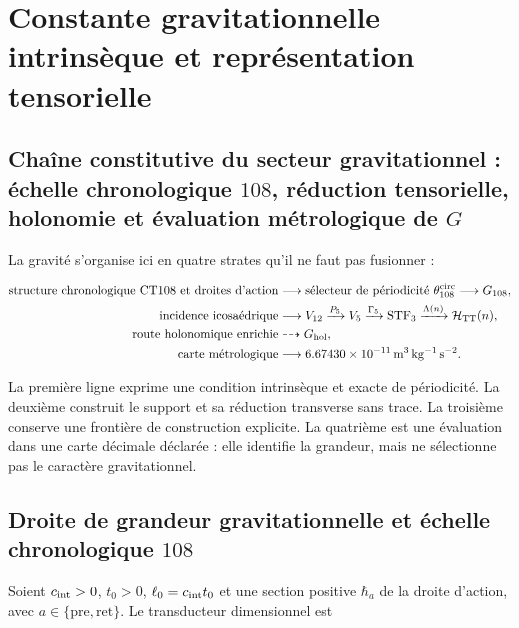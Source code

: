 \section{Constante gravitationnelle intrinsèque et représentation tensorielle}
\label{rm:ch:gravity}

\subsection{Chaîne constitutive du secteur gravitationnel : échelle chronologique \texorpdfstring{\(108\)}{108}, réduction tensorielle, holonomie et évaluation métrologique de \texorpdfstring{\(G\)}{G}}

La gravité s'organise ici en quatre strates qu'il ne faut pas fusionner :

\begin{equation}
\label{rm:eq:gravity-causal-chain}
\begin{aligned}
\text{structure chronologique CT108 et droites d'action}
&\longrightarrow \text{sélecteur de périodicité }\theta_{108}^{\rm circ}
\longrightarrow G_{108},\\
\text{incidence icosaédrique}
&\longrightarrow V_{12}\xrightarrow{P_5}V_5
\xrightarrow{\Gamma_5}\operatorname{STF}_3
\xrightarrow{\Lambda(n)}\mathcal H_{\rm TT}(n),\\
\text{route holonomique enrichie}
&\dashrightarrow G_{\rm hol},\\
\text{carte métrologique}
&\longrightarrow 6.67430\times10^{-11}\,
\mathrm{m^3\,kg^{-1}\,s^{-2}}.
\end{aligned}
\end{equation}

La première ligne exprime une condition intrinsèque et exacte de
périodicité. La deuxième construit
le support et sa réduction transverse sans trace. La troisième conserve une
frontière de construction explicite. La quatrième est une évaluation dans une
carte décimale déclarée : elle identifie la grandeur, mais ne sélectionne pas le caractère
gravitationnel.

\subsection{Droite de grandeur gravitationnelle et échelle chronologique \texorpdfstring{\(108\)}{108}}

Soient \(c_{\rm int}>0\), \(t_0>0\),
\(\ell_0=c_{\rm int}t_0\) et une section positive
\(\hbar_a\) de la droite d'action, avec
\(a\in\{\mathrm{pre},\mathrm{ret}\}\). Le transducteur dimensionnel est

